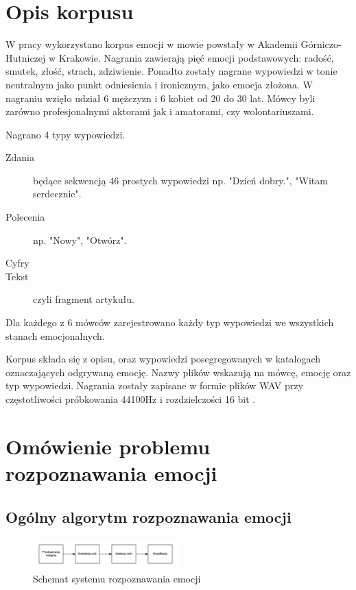 \documentclass[a4paper,12pt,twoside,openany]{report}
\begin{document}
    \chapter{Opis korpusu}
    W pracy wykorzystano korpus emocji w mowie powstały w Akademii Górniczo-Hutniczej w Krakowie.
    Nagrania zawierają pięć emocji podstawowych: radość, smutek, złość, strach, zdziwienie.
    Ponadto zostały nagrane wypowiedzi w tonie neutralnym jako punkt odniesienia i ironicznym, jako emocja złożona.
    W nagraniu wzięło udział 6 mężczyzn i 6 kobiet od 20 do 30 lat. 
    Mówcy byli zarówno profesjonalnymi aktorami jak i amatorami, czy wolontariuszami.

    Nagrano 4 typy wypowiedzi.
    \begin{description}
	    \item [Zdania] będące sekwencją 46 prostych wypowiedzi np. "Dzień dobry.", "Witam serdecznie".
	    \item [Polecenia]  np. "Nowy", "Otwórz".
	    \item [Cyfry]
	    \item [Tekst] czyli fragment artykułu.
    \end{description}
    Dla każdego z 6 mówców zarejestrowano każdy typ wypowiedzi we wszystkich stanach emocjonalnych.

    Korpus składa się z opisu, oraz wypowiedzi posegregowanych w katalogach oznaczających odgrywaną emocję.
    Nazwy plików wskazują na mówcę, emocję oraz typ wypowiedzi.
    Nagrania zostały zapisane w formie plików WAV przy częstotliwości próbkowania 44100Hz i rozdzielczości 16 bit \cite{Igras2009}.

    \chapter{Omówienie problemu rozpoznawania emocji}
    \label{ch:omowienie_problemu}
    \section{Ogólny algorytm rozpoznawania emocji}
    \label{sec:ogol}
    \begin{figure}[h]
        \centering
        \includegraphics[width=0.5\textwidth]{generic_schema}
        \caption{Schemat systemu rozpoznawania emocji}
    \end{figure}
\end{document}
